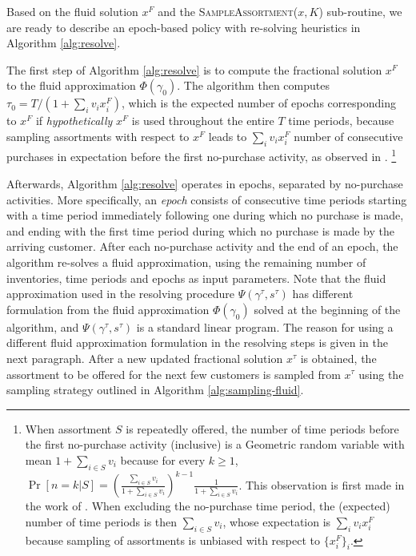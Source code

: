\documentclass[opre]{informs3aa}
\begin{document}
Based on the fluid solution $x^F$ and the \textsc{SampleAssortment}($x,K$) sub-routine, we are ready to describe an epoch-based policy
with re-solving heuristics in Algorithm \ref{alg:resolve}.

The first step of Algorithm \ref{alg:resolve} is to compute the fractional solution $x^F$ to the fluid approximation $\Phi(\gamma_0)$.
{The algorithm then computes $\tau_0=T/(1+\sum_i v_ix_i^F)$, which is the expected number of epochs corresponding to $x^F$
if \emph{hypothetically} $x^F$ is used throughout the entire $T$ time periods,
because sampling assortments with respect to $x^F$ leads to $\sum_i v_ix_i^F$ number of consecutive purchases in expectation before the first no-purchase activity,
 as observed in \citep[Corollary A.1]{agrawal2019mnl}.}
\footnote{When assortment $S$ is repeatedly offered, the number of time periods before the first no-purchase activity (inclusive)
is a Geometric random variable with mean $1+\sum_{i\in S}v_i$ because for every $k\geq 1$, $\Pr[n=k|S]=(\frac{\sum_{i\in S}v_i}{1+\sum_{i\in S}v_i})^{k-1} \frac{1}{1+\sum_{i\in S}v_i}$.
This observation is first made in the work of \cite{agrawal2019mnl}.
When excluding the no-purchase time period, the (expected) number of time periods is then $\sum_{i\in S}v_i$, whose expectation is $\sum_i v_ix_i^F$ because sampling of assortments is unbiased with respect to $\{x_i^F\}_i$.}

Afterwards, Algorithm \ref{alg:resolve} operates in epochs, separated by no-purchase activities. 
{More specifically, an \emph{epoch} consists of consecutive time periods starting with a time period immediately following one during which no purchase is made, and ending with the first time period during which no purchase is made by the arriving customer.}
After each no-purchase activity and the end of an epoch, 
the algorithm re-solves a fluid approximation, using the remaining number of inventories, time periods and epochs as input parameters.
Note that the fluid approximation used in the resolving procedure $\Psi(\gamma^\tau,s^\tau)$ has different formulation from the fluid approximation $\Phi(\gamma_0)$
solved at the beginning of the algorithm, and $\Psi(\gamma^\tau,s^\tau)$ is a standard linear program.
The reason for using a different fluid approximation formulation in the resolving steps is given in the next paragraph.
After a new updated fractional solution $x^\tau$ is obtained, the assortment to be offered for the next few customers is sampled
from $x^\tau$ using the sampling strategy outlined in Algorithm \ref{alg:sampling-fluid}.
\end{document}
